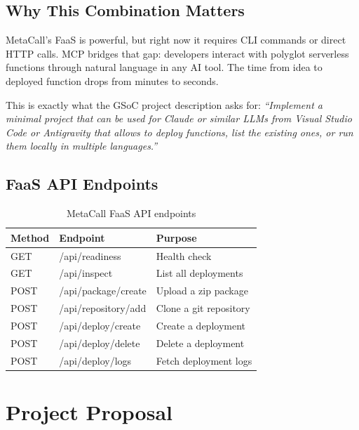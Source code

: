 \documentclass[12pt, a4paper]{article}
\begin{document}
\subsection{Why This Combination Matters}

MetaCall's FaaS is powerful, but right now it requires CLI commands or
direct HTTP calls. MCP bridges that gap: developers interact with
polyglot serverless functions through natural language in any AI tool.
The time from idea to deployed function drops from minutes to seconds.

This is exactly what the GSoC project description asks for:
\emph{``Implement a minimal project that can be used for Claude or
similar LLMs from Visual Studio Code or Antigravity that allows to
deploy functions, list the existing ones, or run them locally in
multiple languages.''}

\subsection{FaaS API Endpoints}

\begin{table}[H]
\centering
{}
\begin{tabularx}{\textwidth}{>{\ttfamily\small}l >{\ttfamily\small}l X}
  \toprule
  \rowcolor{mcblue!15}
  \textbf{Method} & \textbf{Endpoint} & \textbf{Purpose} \\
  \midrule
  GET  & /api/readiness       & Health check \\
  GET  & /api/inspect         & List all deployments \\
  POST & /api/package/create  & Upload a zip package \\
  POST & /api/repository/add  & Clone a git repository \\
  POST & /api/deploy/create   & Create a deployment \\
  POST & /api/deploy/delete   & Delete a deployment \\
  POST & /api/deploy/logs     & Fetch deployment logs \\
  \bottomrule
\end{tabularx}
\caption{MetaCall FaaS API endpoints}
\end{table}

\newpage
\section{Project Proposal}
\end{document}
